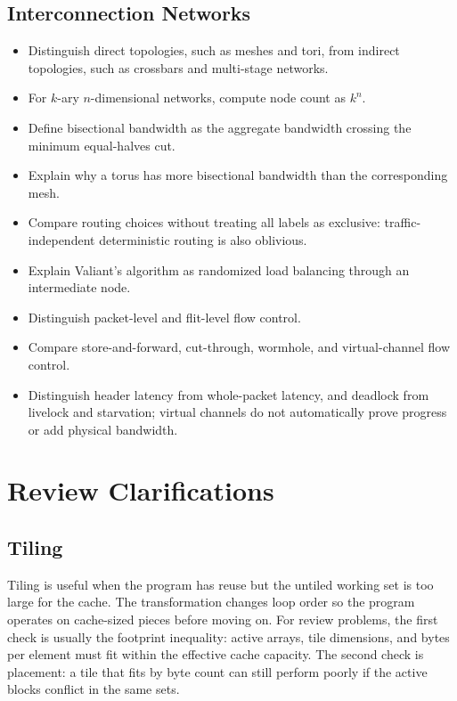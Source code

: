 \subsection*{Interconnection Networks}
\begin{itemize}
    \item Distinguish direct topologies, such as meshes and tori, from indirect topologies, such as crossbars and multi-stage networks.
    \item For $k$-ary $n$-dimensional networks, compute node count as $k^n$.
    \item Define bisectional bandwidth as the aggregate bandwidth crossing the minimum equal-halves cut.
    \item Explain why a torus has more bisectional bandwidth than the corresponding mesh.
    \item Compare routing choices without treating all labels as exclusive: traffic-independent deterministic routing is also oblivious.
    \item Explain Valiant's algorithm as randomized load balancing through an intermediate node.
    \item Distinguish packet-level and flit-level flow control.
    \item Compare store-and-forward, cut-through, wormhole, and virtual-channel flow control.
    \item Distinguish header latency from whole-packet latency, and deadlock from livelock and starvation; virtual channels do not automatically prove progress or add physical bandwidth.
\end{itemize}


\section{Review Clarifications}\label{sec:app-e-clarifications}

\subsection*{Tiling}
Tiling is useful when the program has reuse but the untiled working set is too large for the cache.
The transformation changes loop order so the program operates on cache-sized pieces before moving on.
For review problems, the first check is usually the footprint inequality: active arrays, tile dimensions, and bytes per element must fit within the effective cache capacity.
The second check is placement: a tile that fits by byte count can still perform poorly if the active blocks conflict in the same sets.

